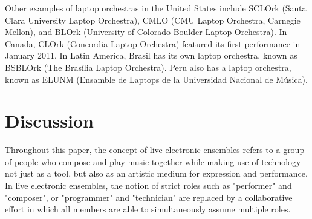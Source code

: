 \documentclass[letterpaper, 12pt]{article}
\begin{document}
%
Other examples of laptop orchestras in the United States include SCLOrk (Santa Clara University Laptop Orchestra), CMLO (CMU Laptop Orchestra, Carnegie Mellon), and BLOrk (University of Colorado Boulder Laptop Orchestra).
%
In Canada, CLOrk (Concordia Laptop Orchestra) featured its first performance in January 2011.
%
In Latin America, Brasil has its own laptop orchestra, known as BSBLOrk (The Brasília Laptop Orchestra).
%
Peru also has a laptop orchestra, known as ELUNM (Ensamble de Laptops de la Universidad Nacional de Música).

\section{Discussion}

%
Throughout this paper, the concept of live electronic ensembles refers to a group of people who compose and play music together while making use of technology not just as a tool, but also as an artistic medium for expression and performance.
%
In live electronic ensembles, the notion of strict roles such as "performer" and "composer", or "programmer" and "technician" are replaced by a collaborative effort in which all members are able to simultaneously assume multiple roles.
\end{document}
